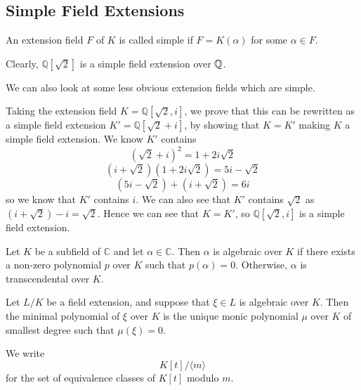 \subsection{Simple Field Extensions}
\begin{definition}
An extension field \(F\) of \(K\) is called simple if \(F = K(\alpha)\) for some \(\alpha \in F\).
\end{definition}
\begin{example}
Clearly, \(\mathbb{Q}[\sqrt{2}]\) is a simple field extension over \(\mathbb Q\).
\end{example}
We can also look at some less obvious extension fields which are simple.
\begin{example}
Taking the extension field \(K = \mathbb{Q}[\sqrt{2}, i]\), we prove that this can be rewritten as a simple field extension \(K' = \mathbb{Q}[\sqrt{2} + i]\), by showing that \(K=K'\) making \(K\) a simple field extension. We know \(K'\) contains
\[(\sqrt{2} + i)^2 = 1 + 2i\sqrt{2}\]
\[(i + \sqrt{2})(1+2i\sqrt{2}) = 5i - \sqrt{2}\]
\[(5i - \sqrt{2}) + (i + \sqrt{2}) = 6i\]
so we know that \(K'\) contains \(i\). We can also see that \(K'\) contains \(\sqrt{2}\) as \((i+\sqrt{2})-i = \sqrt{2}\). Hence we can see that \(K = K'\), so \(\mathbb{Q}[\sqrt{2},i]\) is a simple field extension.
\end{example}

\begin{definition}
    Let $K$ be a subfield of $\mathbb{C}$ and let $\alpha \in \mathbb{C}$. Then $\alpha$ is algebraic over $K$ if there exists a non-zero polynomial $p$ over $K$ such that $p(\alpha)=0$. Otherwise, $\alpha$ is transcendental over $K$.
\end{definition}

\begin{definition}
    Let $L / K$ be a field extension, and suppose that $\xi \in L$ is algebraic over $K$. Then the minimal polynomial of $\xi$ over $K$ is the unique monic polynomial $\mu$ over $K$ of smallest degree such that $\mu(\xi)=0$.


We write
$$
K[t] /\langle m\rangle
$$
for the set of equivalence classes of $K[t]$ modulo $m$. 
\end{definition}


